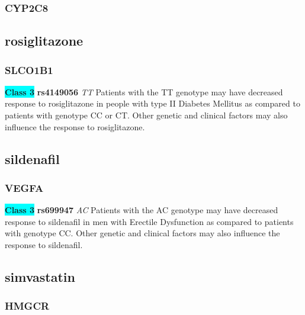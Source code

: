 \documentclass{book}
\begin{document}
\subsubsection{ CYP2C8 }

\begin{center}



\end{center}\subsection{ rosiglitazone }


\subsubsection{ SLCO1B1 }

\begin{center}
\textbf{\colorbox{cyan} {Class 3}} \textbf{ rs4149056 } \textit{ TT }
Patients with the TT genotype may have decreased response to rosiglitazone in people with type II Diabetes Mellitus as compared to patients with genotype CC or CT. Other genetic and clinical factors may also influence the response to rosiglitazone.


\end{center}\subsection{ sildenafil }


\subsubsection{ VEGFA }

\begin{center}
\textbf{\colorbox{cyan} {Class 3}} \textbf{ rs699947 } \textit{ AC }
Patients with the AC genotype may have decreased response to sildenafil in men with Erectile Dysfunction as compared to patients with genotype CC. Other genetic and clinical factors may also influence the response to sildenafil.


\end{center}\subsection{ simvastatin }


\subsubsection{ HMGCR }
\end{document}
